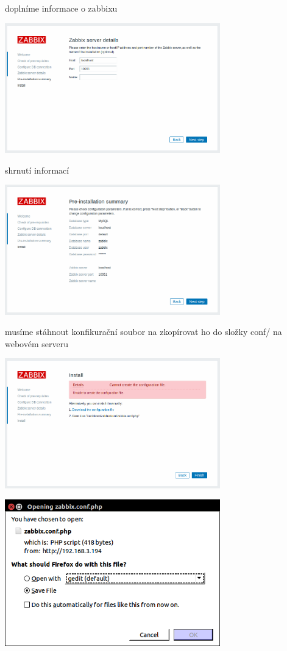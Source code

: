 \documentclass{article}
\begin{document}
doplníme informace o zabbixu
\begin{center}
  \includegraphics[width=0.7\textwidth]{obrazky/install_4.png}
\end{center}
shrnutí informací
\begin{center}
  \includegraphics[width=0.7\textwidth]{obrazky/install_5.png}
\end{center}
musíme stáhnout konfikurační soubor na zkopírovat ho do složky conf/ na webovém serveru
\begin{center}
  \includegraphics[width=0.7\textwidth]{obrazky/install_6.png}
\end{center}
\begin{center}
  \includegraphics[width=0.7\textwidth]{obrazky/saving_zabbix_conf.png}
\end{center}
\end{document}
